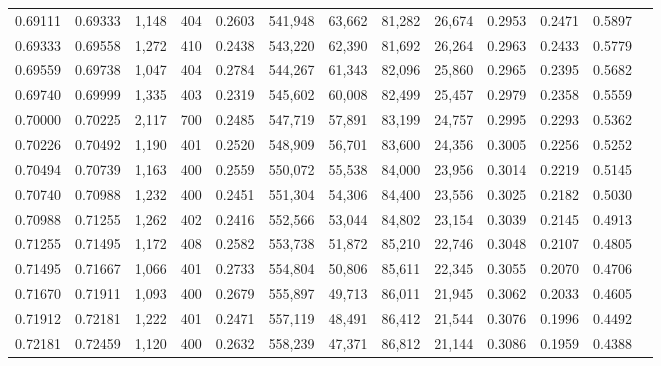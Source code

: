 \begin{tabular}{rrrrrrrrrrrrr}
0.69111 & 0.69333 &  1,148 &   404 &                                     0.2603 & 541,948 &  63,662 &  81,282 &  26,674 & 0.2953 & 0.2471 & 0.5897 \\
0.69333 & 0.69558 &  1,272 &   410 &                                     0.2438 & 543,220 &  62,390 &  81,692 &  26,264 & 0.2963 & 0.2433 & 0.5779 \\
0.69559 & 0.69738 &  1,047 &   404 &                                     0.2784 & 544,267 &  61,343 &  82,096 &  25,860 & 0.2965 & 0.2395 & 0.5682 \\
0.69740 & 0.69999 &  1,335 &   403 &                                     0.2319 & 545,602 &  60,008 &  82,499 &  25,457 & 0.2979 & 0.2358 & 0.5559 \\
0.70000 & 0.70225 &  2,117 &   700 &                                     0.2485 & 547,719 &  57,891 &  83,199 &  24,757 & 0.2995 & 0.2293 & 0.5362 \\
0.70226 & 0.70492 &  1,190 &   401 &                                     0.2520 & 548,909 &  56,701 &  83,600 &  24,356 & 0.3005 & 0.2256 & 0.5252 \\
0.70494 & 0.70739 &  1,163 &   400 &                                     0.2559 & 550,072 &  55,538 &  84,000 &  23,956 & 0.3014 & 0.2219 & 0.5145 \\
0.70740 & 0.70988 &  1,232 &   400 &                                     0.2451 & 551,304 &  54,306 &  84,400 &  23,556 & 0.3025 & 0.2182 & 0.5030 \\
0.70988 & 0.71255 &  1,262 &   402 &                                     0.2416 & 552,566 &  53,044 &  84,802 &  23,154 & 0.3039 & 0.2145 & 0.4913 \\
0.71255 & 0.71495 &  1,172 &   408 &                                     0.2582 & 553,738 &  51,872 &  85,210 &  22,746 & 0.3048 & 0.2107 & 0.4805 \\
0.71495 & 0.71667 &  1,066 &   401 &                                     0.2733 & 554,804 &  50,806 &  85,611 &  22,345 & 0.3055 & 0.2070 & 0.4706 \\
0.71670 & 0.71911 &  1,093 &   400 &                                     0.2679 & 555,897 &  49,713 &  86,011 &  21,945 & 0.3062 & 0.2033 & 0.4605 \\
0.71912 & 0.72181 &  1,222 &   401 &                                     0.2471 & 557,119 &  48,491 &  86,412 &  21,544 & 0.3076 & 0.1996 & 0.4492 \\
0.72181 & 0.72459 &  1,120 &   400 &                                     0.2632 & 558,239 &  47,371 &  86,812 &  21,144 & 0.3086 & 0.1959 & 0.4388 \\

\end{tabular}
